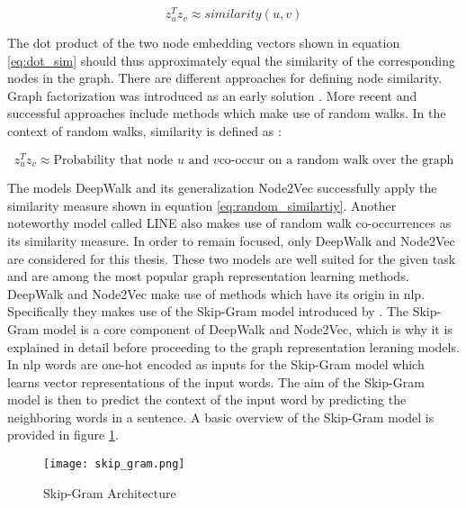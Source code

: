 	\begin{equation}
		z_u^Tz_v \approx similarity(u,v)
		\label{eq:dot_sim}
	\end{equation}

	\noindent The dot product of the two node embedding vectors shown in
	equation \ref{eq:dot_sim} should thus approximately equal the similarity of 
	the corresponding nodes in the graph. There are different approaches for 
	defining node similarity. Graph factorization was introduced as an early 
	solution \citep{ahmed2013distributed}. More recent and successful approaches 
	include methods which make use of random walks. In the context of random 
	walks, similarity is defined as \citep{leskovec2021lecture}:

	\begin{equation}
		z_u^Tz_v \approx \text{Probability that node $u$ and $v$
								co-occur on a random walk over the graph}
	\label{eq:random_similartiy}
	\end{equation}

	\noindent The models DeepWalk \citep{perozzi2014deepwalk} and its 
	generalization Node2Vec \citep{grover2016node2vec} successfully apply the
	similarity measure shown in equation \ref{eq:random_similartiy}. Another 
	noteworthy model called LINE \citep{tang2015line} also makes use of random
	walk co-occurrences as its similarity measure. In order to remain focused,
	only DeepWalk and Node2Vec are considered for this thesis. These two models
	are well suited for the given task and are among the most popular graph
	representation learning methods. \\

	\noindent DeepWalk and Node2Vec make use of methods which have its origin in 
	\ac{nlp}. Specifically they makes use of the Skip-Gram model introduced by 
	\cite{mikolov2013efficient,mikolov2013distributed}. 
	The Skip-Gram model is a core component of DeepWalk and Node2Vec, which is why 
	it is explained in detail before proceeding to the graph representation
	leraning models. \\

	\noindent In \ac{nlp} words are one-hot encoded as inputs for the Skip-Gram model 
	which learns vector representations of the input words. The aim of the
	Skip-Gram model is then to predict the context of the input word by
	predicting the neighboring words in a sentence. A basic overview of the 
	Skip-Gram model is provided in figure \ref{fig:skip_gram}. 

	\begin{figure}[h]
		\centering
		\texttt{[image: skip\_gram.png]}
		\caption{Skip-Gram Architecture}
		\cite[p. 5]{mikolov2013efficient}
		\label{fig:skip_gram}
	\end{figure}


